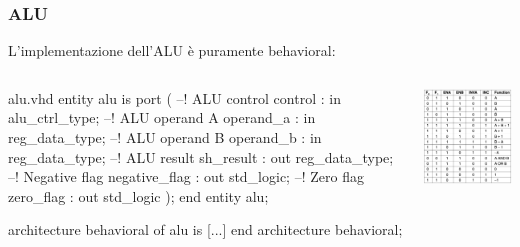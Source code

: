 \documentclass{beamer}
\begin{document}
\begin{frame}[fragile]
  \frametitle{ALU}
  L'implementazione dell'ALU è puramente behavioral:
  \begin{columns}
    \begin{column}{0.5\textwidth}
  \begin{myvhdl}{alu.vhd}
entity alu is
  port (
    --! ALU control
    control       : in  alu_ctrl_type;
    --! ALU operand A
    operand_a     : in  reg_data_type;
    --! ALU operand B
    operand_b     : in  reg_data_type;
    --! ALU result
    sh_result     : out reg_data_type;
    --! Negative flag
    negative_flag : out std_logic;
    --! Zero flag
    zero_flag     : out std_logic
    );
end entity alu;

architecture behavioral of alu is
  [...]
end architecture behavioral;
\end{myvhdl}
\end{column}
\begin{column}{0.5\textwidth}
\begin{center}
  \includegraphics[width=\textwidth]{alu_func.png}
\end{center}
\end{column}
\end{columns}
\end{frame}
\end{document}

